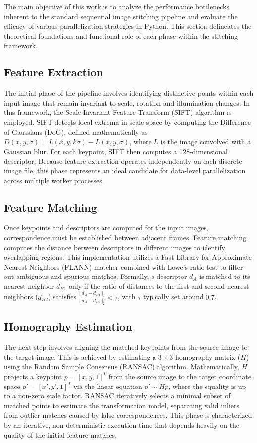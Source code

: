 \documentclass[10pt,twocolumn,letterpaper]{article}
\begin{document}
The main objective of this work is to analyze the performance bottlenecks inherent to 
the standard sequential image stitching pipeline and evaluate the efficacy of various parallelization strategies in Python. 
This section delineates the theoretical foundations and functional role of 
each phase within the stitching framework.

\subsection{Feature Extraction}
The initial phase of the pipeline involves identifying distinctive points within each input image
 that remain invariant to scale, rotation and illumination changes. In this framework, 
 the Scale-Invariant Feature Transform (SIFT) algorithm is employed. SIFT detects local extrema 
 in scale-space by computing the Difference of Gaussians (DoG), defined mathematically as 
 $D(x, y, \sigma) = L(x, y, k\sigma) - L(x, y, \sigma)$, where $L$ is the image convolved with a Gaussian blur. 
For each keypoint, SIFT then computes a 128-dimensional descriptor. 
 Because feature extraction operates independently on each discrete image file, 
 this phase represents an ideal candidate for data-level parallelization across multiple worker processes.

\subsection{Feature Matching}
Once keypoints and descriptors are computed for the input images, correspondence must be 
established between adjacent frames. Feature matching computes the distance 
between descriptors in different images to identify overlapping regions.
 This implementation utilizes a Fast Library for Approximate Nearest Neighbors (FLANN) matcher combined with Lowe's ratio
 test to filter out ambiguous and spurious matches. 
 Formally, a descriptor $d_A$ is matched to its nearest neighbor $d_{B1}$ only if the ratio of distances to the first and second nearest neighbors ($d_{B2}$) satisfies 
 $\frac{||d_A - d_{B1}||_2}{||d_A - d_{B2}||_2} < \tau$, with $\tau$ typically set around $0.7$.

\subsection{Homography Estimation} 
The next step involves aligning the matched keypoints from the source image to the target image.
This is achieved by estimating a $3\times3$ homography matrix ($H$) 
using the Random Sample Consensus (RANSAC) algorithm. 
Mathematically, $H$ projects a keypoint $p = [x, y, 1]^T$ from the source image to the target coordinate space $p' = [x', y', 1]^T$ 
via the linear equation $p' \sim H p$, where the equality is up to a non-zero scale factor.
RANSAC iteratively selects a minimal subset of matched points to estimate 
the transformation model, separating valid inliers from outlier matches caused 
by false correspondences. This phase is characterized by an iterative, 
non-deterministic execution time that depends heavily on the quality of the initial feature matches.
\end{document}
